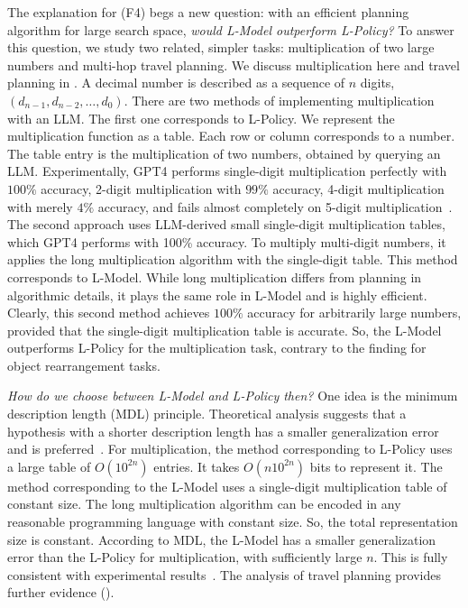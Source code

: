 The explanation for (F4) begs a new question: with an efficient planning
algorithm for large search space, \emph{would L-Model outperform L-Policy?} To
answer this question, we study two related, simpler tasks: multiplication of
two large numbers and multi-hop travel planning. We discuss
multiplication here and travel planning in . A decimal
number is described as a sequence of $n$ digits,
$(d_{n-1}, d_{n-2}, \dots, d_0)$. There are two methods of implementing
multiplication with an LLM. The first one corresponds to L-Policy. We
represent the multiplication function as a table. Each row or column
corresponds to a number. The table entry is the multiplication of two numbers,
obtained by querying an LLM. Experimentally, GPT4 performs single-digit
multiplication perfectly with $100\%$ accuracy, 2-digit multiplication with
$99\%$ accuracy, 4-digit multiplication with merely $4\%$ accuracy, and fails
almost completely on 5-digit multiplication~\cite{dziri2023faith}. The second approach uses LLM-derived small single-digit multiplication tables, which GPT4 performs with 100\% accuracy. To multiply multi-digit
numbers, it applies the long multiplication algorithm with the single-digit
table. This method corresponds to L-Model. While long multiplication 
differs from planning in algorithmic details, it plays the same role in L-Model and is highly
efficient. Clearly, this second method achieves $100\%$ accuracy for arbitrarily
large numbers, provided that the single-digit multiplication table is
accurate. So, the L-Model outperforms L-Policy for the multiplication
task, contrary to the finding for object rearrangement tasks.

\emph{How do we choose between L-Model and L-Policy then? } One idea is the
minimum description length (MDL) principle. Theoretical analysis suggests that
a hypothesis with a shorter description length has a smaller generalization
error and is preferred~\cite{shalev2014understanding}. For multiplication, the
method corresponding to L-Policy uses a large table of $O(10^{2n})$
entries. It takes $O(n 10^{2n})$ bits to represent it. The method
corresponding to the L-Model uses a single-digit multiplication table of
constant size. The long multiplication algorithm can be encoded in any
reasonable programming language with constant size. So, the total
representation size is constant. According to MDL, the L-Model has a smaller
generalization error than the L-Policy for multiplication, with sufficiently
large $n$. This is fully consistent with experimental
results~\cite{dziri2023faith}. The analysis of travel planning
provides further evidence ().


